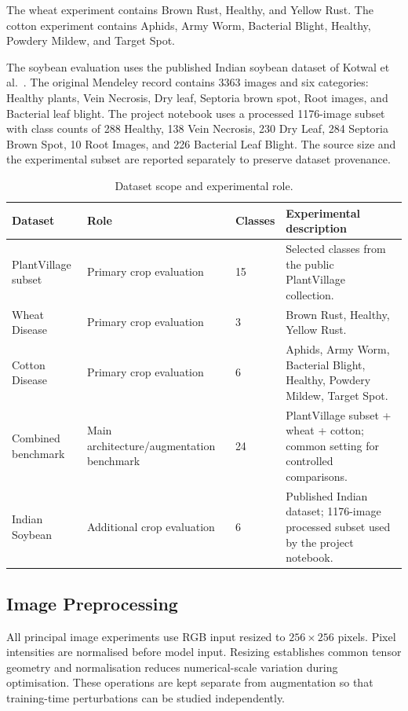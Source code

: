 \documentclass[a4paper,fleqn]{cas-dc}
\begin{document}
The wheat experiment contains Brown Rust, Healthy, and Yellow Rust. The cotton experiment contains Aphids, Army Worm, Bacterial Blight, Healthy, Powdery Mildew, and Target Spot.

The soybean evaluation uses the published Indian soybean dataset of Kotwal et al.~\citep{kotwal2024}. The original Mendeley record contains 3363 images and six categories: Healthy plants, Vein Necrosis, Dry leaf, Septoria brown spot, Root images, and Bacterial leaf blight. The project notebook uses a processed 1176-image subset with class counts of 288 Healthy, 138 Vein Necrosis, 230 Dry Leaf, 284 Septoria Brown Spot, 10 Root Images, and 226 Bacterial Leaf Blight. The source size and the experimental subset are reported separately to preserve dataset provenance.

\begin{table}[!t]
\centering
\caption{Dataset scope and experimental role.}
\label{tab:datasets}
\small
\begin{tabular}{p{3.0cm}p{3.0cm}p{1.5cm}p{7.0cm}}
\toprule
Dataset & Role & Classes & Experimental description \\
\midrule
PlantVillage subset & Primary crop evaluation & 15 & Selected classes from the public PlantVillage collection. \\
Wheat Disease & Primary crop evaluation & 3 & Brown Rust, Healthy, Yellow Rust. \\
Cotton Disease & Primary crop evaluation & 6 & Aphids, Army Worm, Bacterial Blight, Healthy, Powdery Mildew, Target Spot. \\
Combined benchmark & Main architecture/augmentation benchmark & 24 & PlantVillage subset + wheat + cotton; common setting for controlled comparisons. \\
Indian Soybean & Additional crop evaluation & 6 & Published Indian dataset; 1176-image processed subset used by the project notebook. \\
\bottomrule
\end{tabular}
\end{table}

\subsection{Image Preprocessing}
All principal image experiments use RGB input resized to $256\times256$ pixels. Pixel intensities are normalised before model input. Resizing establishes common tensor geometry and normalisation reduces numerical-scale variation during optimisation. These operations are kept separate from augmentation so that training-time perturbations can be studied independently.
\end{document}
